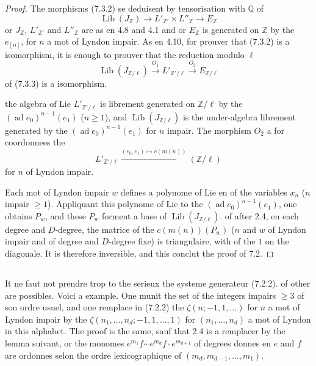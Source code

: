 \documentclass[11pt,a4paper]{article}
\theoremstyle{plain}
\theoremstyle{definition}
\DeclareMathOperator{\Lib}{Lib}
\DeclareMathOperator{\ad}{ad}
\newcommand{\Q}{\mathbb{Q}}
\newcommand{\Z}{\mathbb{Z}}
\begin{document}
\begin{proof}
The morphisms (7.3.2) se deduisent by tensorisation with $\Q$ of
\begin{equation}\label{eq:7.3.3}
\Lib(J_\Z) \to L'_{\Z'} \times L''_\Z \to E_\Z
\end{equation}
or $J_\Z$, $L'_{\Z'}$ and $L''_\Z$ are as en 4.8 and 4.1 and or $E_\Z$ is generated on $\Z$ by the $e_{[n]}$, for $n$ a mot of Lyndon impair. As en 4.10, for prouver that (7.3.2) is a isomorphism, it is enough to prouver that the reduction modulo $\ell$
\begin{equation}\label{eq:7.3.4}
\Lib(J_{\Z/\ell}) \xrightarrow{O_1} L'_{\Z'/\ell} \xrightarrow{O_2} E_{\Z/\ell}
\end{equation}
of (7.3.3) is a isomorphism.

the algebra of Lie $L'_{\Z'/\ell}$ is librement generated on $\Z/\ell$ by the $(\ad e_0)^{n-1}(e_1)$ ($n \geq 1$), and $\Lib(J_{\Z/\ell})$ is the under-algebra librement generated by the $(\ad e_0)^{n-1}(e_1)$ for $n$ impair. The morphism $O_2$ a for coordonnees the
\[
L'_{\Z'/\ell} \xrightarrow{(e_0, e_1) \mapsto c(m(n))} (\Z/\ell)
\]
for $n$ of Lyndon impair.

Each mot of Lyndon impair $w$ defines a polynome of Lie en of the variables $x_n$ ($n$ impair $\geq 1$). Appliquant this polynome of Lie to the $(\ad e_0)^{n-1}(e_1)$, one obtains $P_w$, and these $P_w$ forment a base of $\Lib(J_{\Z/\ell})$. of after 2.4, en each degree and $D$-degree, the matrice of the $c(m(n))(P_w)$ ($n$ and $w$ of Lyndon impair and of degree and $D$-degree fixe) is triangulaire, with of the $1$ on the diagonale. It is therefore inversible, and this conclut the proof of 7.2.
\end{proof}

\subsection{}
It ne faut not prendre trop to the serieux the systeme generateur (7.2.2). of other are possibles. Voici a example. One munit the set of the integers impairs $\geq 3$ of son ordre usuel, and one remplace in (7.2.2) the $\zeta(n; -1, 1, \ldots)$ for $n$ a mot of Lyndon impair by the $\zeta(n_1,\ldots,n_d; -1, 1, \ldots, 1)$ for $(n_1,\ldots,n_d)$ a mot of Lyndon in this alphabet. The proof is the same, sauf that 2.4 is a remplacer by the lemma suivant, or the monomes $e^{m_1}f \cdots e^{m_d}f \cdot e^{m_{d+1}}$ of degrees donnes en $e$ and $f$ are ordonnes selon the ordre lexicographique of $(m_d, m_{d-1},\ldots, m_1)$.
\end{document}
